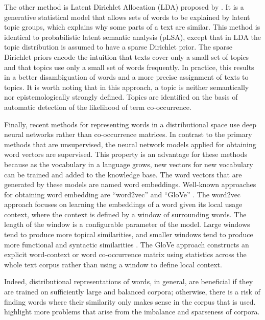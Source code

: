 The other method is Latent Dirichlet Allocation (LDA) proposed by . 
It is a generative statistical model that allows sets of words to be explained by latent topic groups,  which explains why some parts of a text are similar. 
This method is identical to probabilistic latent semantic analysis (pLSA), except that in LDA the topic distribution is assumed to have a sparse Dirichlet prior.
The sparse Dirichlet priors encode the intuition that texts cover only a small set of topics and that topics use only a small set of words frequently. 
In practice, this results in a better disambiguation of words and a more precise assignment of texts to topics.
It is worth noting that in this approach, a topic is neither semantically nor epistemologically strongly defined. 
Topics are identified on the basis of automatic detection of the likelihood of term co-occurrence. 

Finally, recent methods for representing words in a distributional space use deep neural networks rather than co-occurrence matrices. 
In contrast to the primary methods that are unsupervised, the neural network models applied for obtaining word vectors are supervised.  
This property is an advantage for these methods because as the vocabulary in a language grows, new vectors for new vocabulary can be trained and added to the knowledge base. 
The word vectors that are generated by these models are named word embeddings. 
Well-known approaches for obtaining word embedding are ``word2vec''  \cite{mikolov13} and ``GloVe'' \cite{pennington14}. 
The word2vec approach focuses on learning the embeddings of a word given its local usage context, where the context is defined by a window of surrounding words. 
The length of the window is a configurable parameter of the model. 
Large windows tend to produce more topical similarities, and smaller windows tend to produce more functional and syntactic similarities \cite{goldberg17}. 
The GloVe approach constructs an explicit word-context or word co-occurrence matrix using statistics across the whole text corpus rather than using a window to define local context. 

Indeed, distributional representations of words, in general, are beneficial if they are trained on sufficiently large and balanced corpora; otherwise, there is a risk \cite{lindekang98b} of finding words where their similarity only makes sense in the corpus that is used. 
 highlight more problems that arise from the imbalance and sparseness of corpora.

